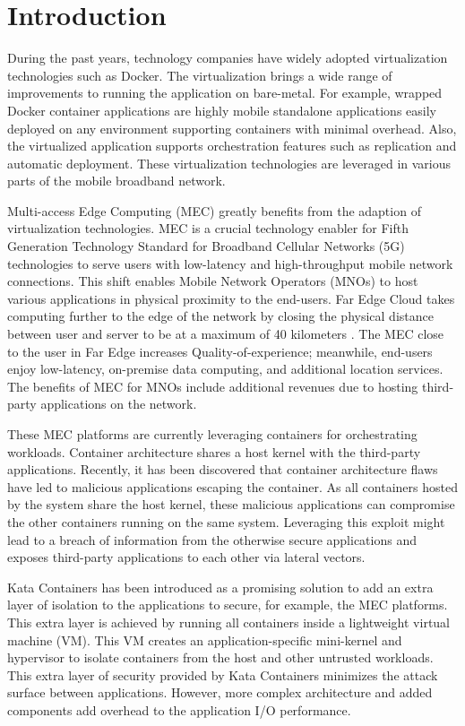 \chapter{Introduction}
\label{chapter:intro}

During the past years, technology companies have widely adopted virtualization technologies such as Docker. The virtualization brings a wide range of improvements to running the application on bare-metal. For example, wrapped Docker container applications are highly mobile standalone applications easily deployed on any environment supporting containers with minimal overhead. Also, the virtualized application supports orchestration features such as replication and automatic deployment. These virtualization technologies are leveraged in various parts of the mobile broadband network.

Multi-access Edge Computing (MEC) greatly benefits from the adaption of virtualization technologies. MEC is a crucial technology enabler for Fifth Generation Technology Standard for Broadband Cellular Networks (5G) technologies to serve users with low-latency and high-throughput mobile network connections. This shift enables Mobile Network Operators (MNOs) to host various applications in physical proximity to the end-users. Far Edge Cloud takes computing further to the edge of the network by closing the physical distance between user and server to be at a maximum of 40 kilometers \cite{AirFrameOpenEdgeServer}. The MEC close to the user in Far Edge increases Quality-of-experience; meanwhile, end-users enjoy low-latency, on-premise data computing, and additional location services. The benefits of MEC for MNOs include additional revenues due to hosting third-party applications on the network.

These MEC platforms are currently leveraging containers for orchestrating workloads. Container architecture shares a host kernel with the third-party applications. Recently, it has been discovered that container architecture flaws have led to malicious applications escaping the container. As all containers hosted by the system share the host kernel, these malicious applications can compromise the other containers running on the same system. Leveraging this exploit might lead to a breach of information from the otherwise secure applications and exposes third-party applications to each other via lateral vectors.

Kata Containers \cite{KataContainers} has been introduced as a promising solution to add an extra layer of isolation to the applications to secure, for example, the MEC platforms. This extra layer is achieved by running all containers inside a lightweight virtual machine (VM). This VM creates an application-specific mini-kernel and hypervisor to isolate containers from the host and other untrusted workloads. This extra layer of security provided by Kata Containers minimizes the attack surface between applications. However, more complex architecture and added components add overhead to the application I/O performance.

